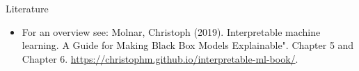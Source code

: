 \documentclass[11pt,compress,t,notes=noshow, xcolor=table]{beamer}
\begin{document}
\begin{vbframe}{Literature}
	\begin{itemize}
		\small
		\item For an overview see: Molnar, Christoph (2019). Interpretable machine learning. A Guide for Making Black Box Models Explainable". Chapter 5 and Chapter 6. \url{https://christophm.github.io/interpretable-ml-book/}.
	\end{itemize}
\end{vbframe}

\endlecture
\end{document}

